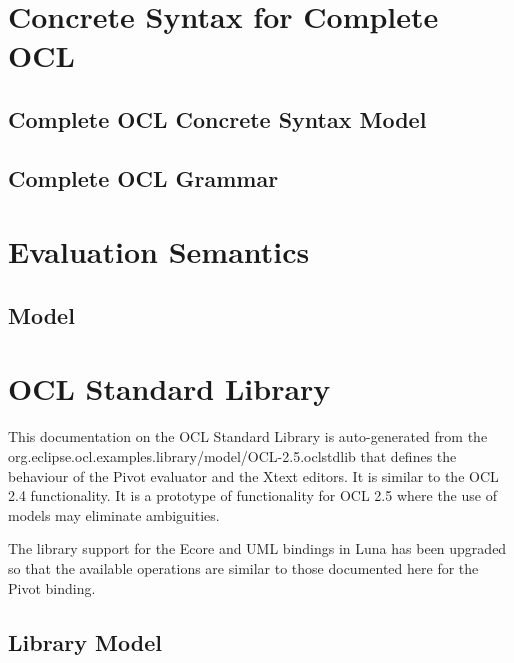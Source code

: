 \documentclass{scrreprt}   %
\begin{document}
\chapter{Concrete Syntax for Complete OCL}\label{ocl:CompleteOCLConcreteSyntax}
\section{Complete OCL Concrete Syntax Model}

\section{Complete OCL Grammar}


\chapter{Evaluation Semantics}\label{ocl:EvaluationSemantics}
\section{Model}


\chapter{OCL Standard Library}
This documentation on the OCL Standard Library is auto-generated from the
org.eclipse.ocl.examples.library/model/OCL-2.5.oclstdlib that defines
the behaviour of the Pivot evaluator and the Xtext editors. It is similar to the OCL 2.4 functionality.
It is a prototype of functionality for OCL 2.5 where the use of models may eliminate ambiguities.
		
The library support for the Ecore and UML bindings in Luna has been upgraded so that the available operations
are similar to those documented here for the Pivot binding.
\section{Library Model}





\end{document}
